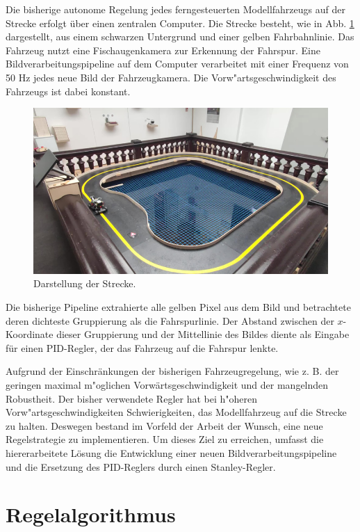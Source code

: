 \documentclass[arbeit=studie,oneside,BCOR=12mm]{ArbeitRST}
\begin{document}
Die bisherige autonome Regelung jedes ferngesteuerten Modellfahrzeugs auf der
Strecke erfolgt über einen zentralen Computer. Die Strecke besteht, wie in Abb.
\ref{track_and_car} dargestellt, aus einem schwarzen Untergrund und einer
gelben Fahrbahnlinie. 
Das Fahrzeug nutzt eine Fischaugenkamera zur Erkennung der Fahrspur. Eine
Bildverarbeitungspipeline auf dem Computer verarbeitet mit einer Frequenz von
50 Hz jedes neue Bild der Fahrzeugkamera. Die Vorw"artsgeschwindigkeit des
Fahrzeugs ist dabei konstant. 

\begin{figure}[h]
    \centering
    \includegraphics[scale=0.48]{track_and_car}
    \caption{Darstellung der Strecke.}
    \label{track_and_car}
\end{figure}

Die bisherige Pipeline extrahierte alle gelben
Pixel aus dem Bild und betrachtete deren dichteste Gruppierung als die
Fahrspurlinie. Der Abstand zwischen der $x$-Koordinate dieser Gruppierung und
der Mittellinie des Bildes diente als Eingabe für einen PID-Regler, der das
Fahrzeug auf die Fahrspur lenkte. 

Aufgrund der Einschränkungen der bisherigen Fahrzeugregelung, wie z. B. der
geringen maximal m"oglichen Vorwärtsgeschwindigkeit und der mangelnden
Robustheit. Der bisher verwendete Regler hat bei h"oheren Vorw"artsgeschwindigkeiten
Schwierigkeiten, das Modellfahrzeug auf die Strecke zu halten. Deswegen bestand im
Vorfeld der Arbeit der Wunsch, eine neue Regelstrategie
zu implementieren. Um dieses Ziel zu erreichen, umfasst die hiererarbeitete
Lösung die Entwicklung einer neuen Bildverarbeitungspipeline und die Ersetzung des
PID-Reglers durch einen Stanley-Regler.

\chapter{Regelalgorithmus}
\end{document}
